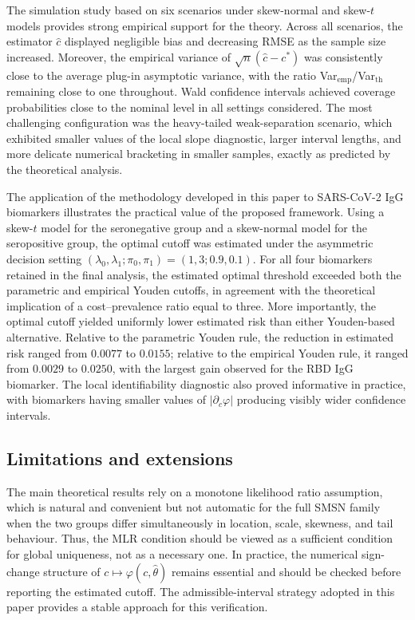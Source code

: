 \documentclass[11pt,a4paper]{article}
\theoremstyle{definition}
\theoremstyle{remark}
\newcommand{\1}{\mathbf{1}}
\begin{document}
The simulation study based on six scenarios under skew-normal and skew-$t$ models provides strong empirical support for the theory. Across all scenarios, the estimator $\hat c$ displayed negligible bias and decreasing RMSE as the sample size increased. Moreover, the empirical variance of $\sqrt{n}(\hat c-c^*)$ was consistently close to the average plug-in asymptotic variance, with the ratio Var$_{\mathrm{emp}}$/Var$_{\mathrm{th}}$ remaining close to one throughout. Wald confidence intervals achieved coverage probabilities close to the nominal level in all settings considered. The most challenging configuration was the heavy-tailed weak-separation scenario, which exhibited smaller values of the local slope diagnostic, larger interval lengths, and more delicate numerical bracketing in smaller samples, exactly as predicted by the theoretical
analysis.

The application of the methodology developed in this paper to SARS-CoV-2 IgG biomarkers illustrates the practical value of the proposed framework. Using a skew-$t$ model for the seronegative group and a skew-normal model for the seropositive group, the optimal cutoff was estimated under the asymmetric decision setting $(\lambda_0,\lambda_1;\pi_0,\pi_1)=(1,3;0.9,0.1)$.
For all four biomarkers retained in the final analysis, the estimated
optimal threshold exceeded both the parametric and empirical Youden
cutoffs, in agreement with the theoretical implication of a
cost--prevalence ratio equal to three. More importantly, the optimal cutoff yielded uniformly lower estimated risk than either Youden-based alternative. Relative to the parametric Youden rule, the reduction in estimated risk ranged from $0.0077$ to $0.0155$; relative to the empirical Youden rule, it ranged from $0.0029$ to $0.0250$, with the largest gain observed for the RBD IgG biomarker. The local identifiability diagnostic also proved informative in practice, with biomarkers having smaller values of $|\partial_c\varphi|$ producing visibly wider confidence intervals.

\subsection*{Limitations and extensions}

The main theoretical results rely on a monotone likelihood ratio
assumption, which is natural and convenient but not automatic for the
full SMSN family when the two groups differ simultaneously in location,
scale, skewness, and tail behaviour. Thus, the MLR condition should be viewed as a sufficient condition for global uniqueness, not as a necessary one.
In practice, the numerical sign-change structure of $c\mapsto\varphi(c,\hat\theta)$ remains essential and should be checked
before reporting the estimated cutoff. The admissible-interval strategy adopted in this paper provides a stable approach for this verification.
\end{document}
